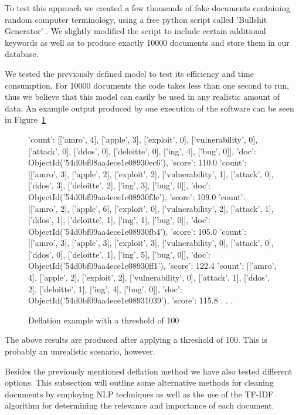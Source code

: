 \documentclass[12pt]{article}
\newcounter{subsubsubsection}[subsubsection]
\begin{document}
To test this approach we created a few thousands of fake documents containing random computer terminology, using a free python script called 'Bullshit Generator' \cite{bullgen}. We slightly modified the script to include certain additional keywords as well as to produce exactly 10000 documents and store them in our database. 
\hfill \break\\
\parbox{\linewidth}{
We tested the previously defined model to test its efficiency and time consumption. For 10000 documents the code takes less than one second to run, thus we believe that this model can easily be used in any realistic amount of data. An example output produced by one execution of the software can be seen in Figure~\ref{fig:deflate}
}

\begin{figure}[t]
\begin{footnotesize}
\begin{spverbatim}

{'count': [['amro', 4], ['apple', 3], ['exploit', 0], ['vulnerability', 0], ['attack', 0], ['ddos', 0], ['deloitte', 0], ['ing', 4], ['bug', 0]], 'doc': ObjectId('54d0bf08aa4ece1e08930ec6'), 'score': 110.0}
{'count': [['amro', 3], ['apple', 2], ['exploit', 2], ['vulnerability', 1], ['attack', 0], ['ddos', 3], ['deloitte', 2], ['ing', 3], ['bug', 0]], 'doc': ObjectId('54d0bf09aa4ece1e08930f3e'), 'score': 109.0}
{'count': [['amro', 2], ['apple', 6], ['exploit', 0], ['vulnerability', 2], ['attack', 1], ['ddos', 1], ['deloitte', 1], ['ing', 1], ['bug', 0]], 'doc': ObjectId('54d0bf09aa4ece1e08930fb4'), 'score': 105.0}
{'count': [['amro', 3], ['apple', 3], ['exploit', 3], ['vulnerability', 0], ['attack', 0], ['ddos', 0], ['deloitte', 1], ['ing', 5], ['bug', 0]], 'doc': ObjectId('54d0bf09aa4ece1e08930ff1'), 'score': 122.4}
{'count': [['amro', 4], ['apple', 2], ['exploit', 2], ['vulnerability', 0], ['attack', 1], ['ddos', 2], ['deloitte', 1], ['ing', 4], ['bug', 0]], 'doc': ObjectId('54d0bf09aa4ece1e08931039'), 'score': 115.8}
.
.
.
\end{spverbatim}
\end{footnotesize}
\captionsetup{font=small}
\caption{Deflation example with a threshold of 100}
\label{fig:deflate}
\end{figure}
\newpage 
\hfill \break
The above results are produced after applying a threshold of 100. This is probably an unrealistic scenario, however.
\newpage
{}
\parbox{\linewidth}{
Besides the previously mentioned deflation method we have also tested different options. This subsection will outline some alternative methods for cleaning documents by employing NLP techniques as well as the use of the TF-IDF algorithm for determining the relevance and importance of each document.
}
\end{document}
